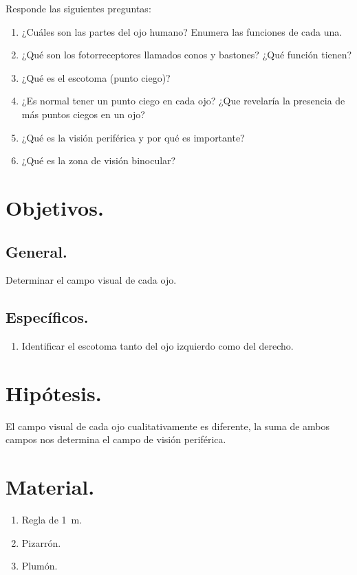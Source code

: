 \documentclass[14pt]{extarticle}
\begin{document}
Responde las siguientes preguntas:

\begin{enumerate}
\itemsep0.5em 
\item ¿Cuáles son las partes del ojo humano? Enumera las funciones de cada una.
\item ¿Qué son los fotorreceptores llamados conos y bastones? ¿Qué función tienen?
\item ¿Qué es el escotoma (punto ciego)?
\item ¿Es normal tener un punto ciego en cada ojo? ¿Que revelaría la presencia de más puntos ciegos en un ojo?
\item ¿Qué es la visión periférica y por qué es importante?
\item ¿Qué es la zona de visión binocular?
\end{enumerate}

\section{Objetivos.}

\subsection{General.}

Determinar el campo visual de cada ojo.

\subsection{Específicos.}

\begin{enumerate}
\item Identificar el escotoma tanto del ojo izquierdo como del derecho.
\end{enumerate}

\section{Hipótesis.}

El campo visual de cada ojo cualitativamente es diferente, la suma de ambos campos nos determina el campo de visión periférica.

\section{Material.}

\begin{enumerate}
\itemsep0.15em 
\item Regla de \SI{1}{\meter}.
\item Pizarrón.
\item Plumón.
\end{enumerate}
\end{document}
